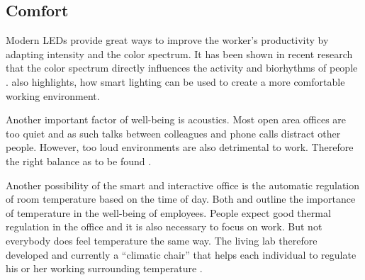 \subsection{Comfort}

Modern LEDs provide great ways to improve the worker's productivity by adapting intensity and the color spectrum. It has been shown in recent research that the color spectrum directly influences the activity and biorhythms of people  \cite{living-lab}. \cite{iotagenda} also highlights, how smart lighting can be used to create a more comfortable working environment.

Another important factor of well-being is acoustics. Most open area offices are too quiet and as such talks between colleagues and phone calls distract other people. However, too loud environments are also detrimental to work. Therefore the right balance as to be found \cite{living-lab}. 

Another possibility of the smart and interactive office is the automatic regulation of room temperature based on the time of day. Both \cite{iotagenda} and \cite{living-lab} outline the importance of temperature in the well-being of employees. People expect good thermal regulation in the office and it is also necessary to focus on work. But not everybody does feel temperature the same way. The living lab therefore developed and currently a ``climatic chair'' that helps each individual to regulate his or her working surrounding temperature \cite{living-lab}.


